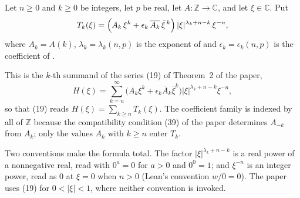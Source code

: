 \begin{definition}
Let $n\ge0$ and $k\ge0$ be integers, let $p$ be real, let
$A\colon\mathbb{Z}\to\mathbb{C}$, and let $\xi\in\mathbb{C}$.  Put
\[
  T_k(\xi)=\Bigl(A_k\,\xi^{k}+\epsilon_k\,\overline{A_k}\,\bar\xi^{\,k}\Bigr)\,
    |\xi|^{\lambda_k+n-k}\,\xi^{-n},
\]
where $A_k=A(k)$, $\lambda_k=\lambda_k(n,p)$ is the exponent of
 and $\epsilon_k=\epsilon_k(n,p)$ is the coefficient of
.

This is the $k$-th summand of the series (19) of Theorem~2 of the paper,
\[
  H(\xi)=\sum_{k=n}^{\infty}\bigl(A_k\xi^k+\epsilon_k\bar A_k\bar\xi^k\bigr)
    |\xi|^{\lambda_k+n-k}\xi^{-n},
\]
so that (19) reads $H(\xi)=\sum_{k\ge n}T_k(\xi)$.  The coefficient family is
indexed by all of $\mathbb{Z}$ because the compatibility condition (39) of the
paper determines $A_{-k}$ from $A_k$; only the values $A_k$ with $k\ge n$ enter
$T_k$.

Two conventions make the formula total.  The factor $|\xi|^{\lambda_k+n-k}$ is a
real power of a nonnegative real, read with $0^{a}=0$ for $a>0$ and $0^{0}=1$;
and $\xi^{-n}$ is an integer power, read as $0$ at $\xi=0$ when $n>0$ (Lean's
convention $w/0=0$).  The paper uses (19) for $0<|\xi|<1$, where neither
convention is invoked.
\end{definition}
